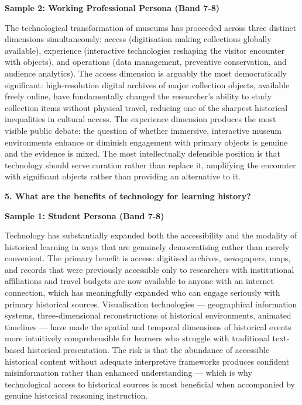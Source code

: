 \textbf{Sample 2: Working Professional Persona (Band 7-8)}

The technological transformation of museums has proceeded across three distinct dimensions simultaneously: access (digitisation making collections globally available), experience (interactive technologies reshaping the visitor encounter with objects), and operations (data management, preventive conservation, and audience analytics). The access dimension is arguably the most democratically significant: high-resolution digital archives of major collection objects, available freely online, have fundamentally changed the researcher's ability to study collection items without physical travel, reducing one of the sharpest historical inequalities in cultural access. The experience dimension produces the most visible public debate: the question of whether immersive, interactive museum environments enhance or diminish engagement with primary objects is genuine and the evidence is mixed. The most intellectually defensible position is that technology should serve curation rather than replace it, amplifying the encounter with significant objects rather than providing an alternative to it.

\separator

\begin{ieltsquestion}
\textbf{5. What are the benefits of technology for learning history?}
\end{ieltsquestion}
\textbf{Sample 1: Student Persona (Band 7-8)}

Technology has substantially expanded both the accessibility and the modality of historical learning in ways that are genuinely democratising rather than merely convenient. The primary benefit is access: digitised archives, newspapers, maps, and records that were previously accessible only to researchers with institutional affiliations and travel budgets are now available to anyone with an internet connection, which has meaningfully expanded who can engage seriously with primary historical sources. Visualisation technologies — geographical information systems, three-dimensional reconstructions of historical environments, animated timelines — have made the spatial and temporal dimensions of historical events more intuitively comprehensible for learners who struggle with traditional text-based historical presentation. The risk is that the abundance of accessible historical content without adequate interpretive frameworks produces confident misinformation rather than enhanced understanding — which is why technological access to historical sources is most beneficial when accompanied by genuine historical reasoning instruction.

